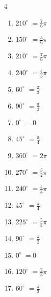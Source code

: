 \begin{multicols}{4}
\begin{enumerate}
  \item $\displaystyle 210^{\circ}$
        $\displaystyle =\frac{7}{6}\pi$

  \item $\displaystyle 150^{\circ}$
        $\displaystyle =\frac{5}{6}\pi$

  \item $\displaystyle 210^{\circ}$
        $\displaystyle =\frac{7}{6}\pi$

  \item $\displaystyle 240^{\circ}$
        $\displaystyle =\frac{4}{3}\pi$

  \item $\displaystyle 60^{\circ}$
        $\displaystyle =\frac{\pi}{3}$

  \item $\displaystyle 90^{\circ}$
        $\displaystyle =\frac{\pi}{2}$

  \item $\displaystyle 0^{\circ}$
        $\displaystyle =0$

  \item $\displaystyle 45^{\circ}$
        $\displaystyle =\frac{\pi}{4}$

  \item $\displaystyle 360^{\circ}$
        $\displaystyle =2\pi$

  \item $\displaystyle 270^{\circ}$
        $\displaystyle =\frac{3}{2}\pi$

  \item $\displaystyle 240^{\circ}$
        $\displaystyle =\frac{4}{3}\pi$

  \item $\displaystyle 45^{\circ}$
        $\displaystyle =\frac{\pi}{4}$

  \item $\displaystyle 225^{\circ}$
        $\displaystyle =\frac{5}{4}\pi$

  \item $\displaystyle 90^{\circ}$
        $\displaystyle =\frac{\pi}{2}$

  \item $\displaystyle 0^{\circ}$
        $\displaystyle =0$

  \item $\displaystyle 120^{\circ}$
        $\displaystyle =\frac{2}{3}\pi$

  \item $\displaystyle 60^{\circ}$
        $\displaystyle =\frac{\pi}{3}$


\end{enumerate}
\end{multicols}
